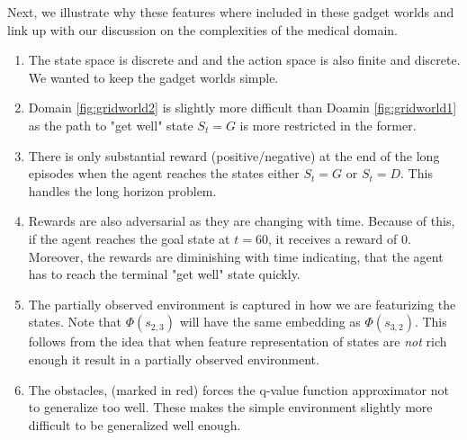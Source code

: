Next, we illustrate why these features where included in these gadget worlds and link up with our discussion on the complexities of the medical domain.

\begin{enumerate}
\item The state space is discrete and and the action space is also finite and  discrete. We wanted to keep the gadget worlds simple.
\item  Domain \ref{fig:gridworld2} is slightly more difficult than Doamin \ref{fig:gridworld1} as the path to "get well" state $S_t = G$ is more restricted in the former.
\item There is only substantial reward (positive/negative) at the end of the long episodes when the agent reaches the states either $S_t = G$ or $S_t = D$. This handles the long horizon problem.
\item Rewards are also adversarial as they are changing with time. Because of this, if the agent reaches the goal state at $t = 60$, it receives a reward of $0$. Moreover, the rewards are diminishing with time indicating, that the agent has to reach the terminal "get well" state quickly.
\item The partially observed environment is captured in how we are featurizing the states. Note that $\Phi(s_{2,3})$ will have the same embedding as $\Phi(s_{3,2})$. This follows from the idea that when feature representation of states are \textit{not} rich enough it result in a partially observed environment. 
\item The obstacles, (marked in red) forces the q-value function approximator not to generalize too well. These makes the simple environment slightly more difficult to be generalized well enough.
\end{enumerate}

